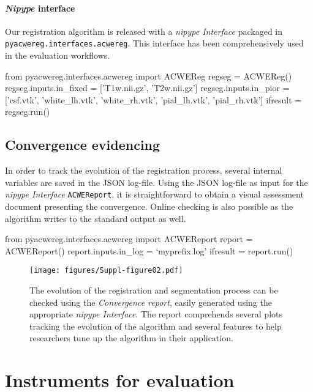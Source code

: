\documentclass[a4paper]{report}
\newcommand*{\codeinline}[1]{\colorbox{listingbg}{\lstinline!#1!}}
\begin{document}
\paragraph{\emph{Nipype} interface}
Our registration algorithm is released with a \emph{nipype Interface} packaged in
  \codeinline{pyacwereg.interfaces.acwereg}.
This interface has been comprehensively used in the evaluation workflows.

\begin{pythoncode}
from pyacwereg.interfaces.acwereg import ACWEReg
regseg = ACWEReg()
regseg.inputs.in_fixed = ['T1w.nii.gz', 'T2w.nii.gz']
regseg.inputs.in_pior = ['csf.vtk', 'white_lh.vtk', 'white_rh.vtk',
                         'pial_lh.vtk', 'pial_rh.vtk']
ifresult = regseg.run()
\end{pythoncode}



\subsection{Convergence evidencing}\label{sec:convergence_evidence}
In order to track the evolution of the registration process, several internal variables
  are saved in the JSON log-file.
Using the JSON log-file as input for the \emph{nipype Interface}
  \codeinline{ACWEReport}, it is straightforward to obtain
  a visual assessment document presenting the convergence.
Online checking is also possible as the algorithm writes to the standard output as well.

\begin{pythoncode}
from pyacwereg.interfaces.acwereg import ACWEReport
report = ACWEReport()
report.inputs.in_log = `myprefix.log'
ifresult = report.run()
\end{pythoncode}

\begin{figure*}[!ht]
	\texttt{[image: figures/Suppl-figure02.pdf]}
	\caption{The evolution of the registration and segmentation process can be
	  checked using the \emph{Convergence report},
	  easily generated using the appropriate \emph{nipype Interface}.
	The report comprehends several plots tracking the evolution of the algorithm and several
	  features to help researchers tune up the algorithm in their application.}%
	  \label{fig:convreport}
\end{figure*}

\section{Instruments for evaluation}
\end{document}
